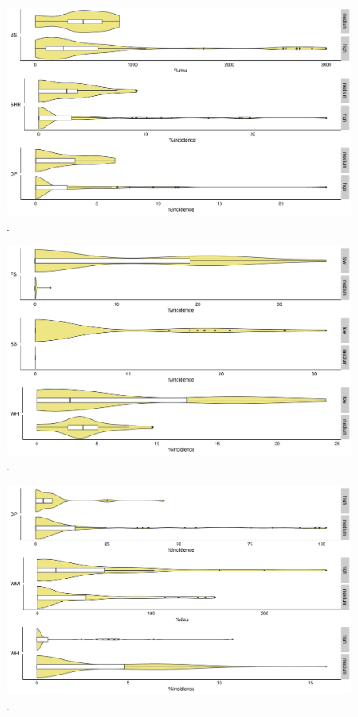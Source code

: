 \begin{figure}
    \centering
        \includegraphics[width = 1\textwidth]{figures/CP_yield_box.pdf}
        \caption{.}
        \label{fig:CP.yield.box}
\end{figure}


\begin{figure}
        \includegraphics[width = 1\textwidth]{figures/OD_yield_box.pdf}
        \caption{.}
\label{fig:OR.yield.box}
\end{figure}

\begin{figure}
    \centering
        \includegraphics[width = 1\textwidth]{figures/RR_yield_box.pdf}
        \caption{.}
        \label{fig:CP.yield.box}
\end{figure}


